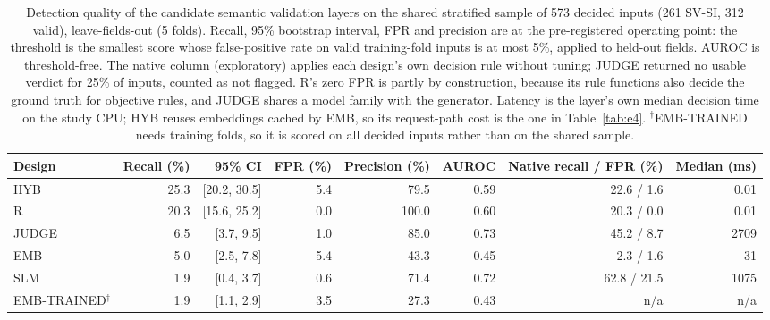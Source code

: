 \begin{table}[t]
\caption{Detection quality of the candidate semantic validation layers on the shared stratified sample
of 573 decided inputs (261 SV-SI, 312 valid), leave-fields-out (5 folds). Recall, 95\% bootstrap
interval, FPR and precision are at the pre-registered operating point: the threshold is the smallest
score whose false-positive rate on valid training-fold inputs is at most 5\%, applied to held-out fields.
AUROC is threshold-free. The native column (exploratory) applies each design's own decision rule
without tuning; JUDGE returned no usable verdict for 25\% of inputs, counted as not flagged. R's zero
FPR is partly by construction, because its rule functions also decide the ground truth for objective
rules, and JUDGE shares a model family with the generator. Latency is the layer's own median decision
time on the study CPU; HYB reuses embeddings cached by EMB, so its request-path cost is the one in
Table~\ref{tab:e4}. $^{\dagger}$EMB-TRAINED needs training folds, so it is scored on all decided
inputs rather than on the shared sample.}
\label{tab:detection}
\centering
\footnotesize
\begin{tabular}{lrrrrrrr}
\toprule
Design & Recall (\%) & 95\% CI & FPR (\%) & Precision (\%) & AUROC & Native recall / FPR (\%) & Median (ms) \\
\midrule
HYB & 25.3 & [20.2, 30.5] & 5.4 & 79.5 & 0.59 & 22.6 / 1.6 & 0.01 \\
R & 20.3 & [15.6, 25.2] & 0.0 & 100.0 & 0.60 & 20.3 / 0.0 & 0.01 \\
JUDGE & 6.5 & [3.7, 9.5] & 1.0 & 85.0 & 0.73 & 45.2 / 8.7 & 2709 \\
EMB & 5.0 & [2.5, 7.8] & 5.4 & 43.3 & 0.45 & 2.3 / 1.6 & 31 \\
SLM & 1.9 & [0.4, 3.7] & 0.6 & 71.4 & 0.72 & 62.8 / 21.5 & 1075 \\
\midrule
EMB-TRAINED$^{\dagger}$ & 1.9 & [1.1, 2.9] & 3.5 & 27.3 & 0.43 & n/a & n/a \\
\bottomrule
\end{tabular}
\end{table}
